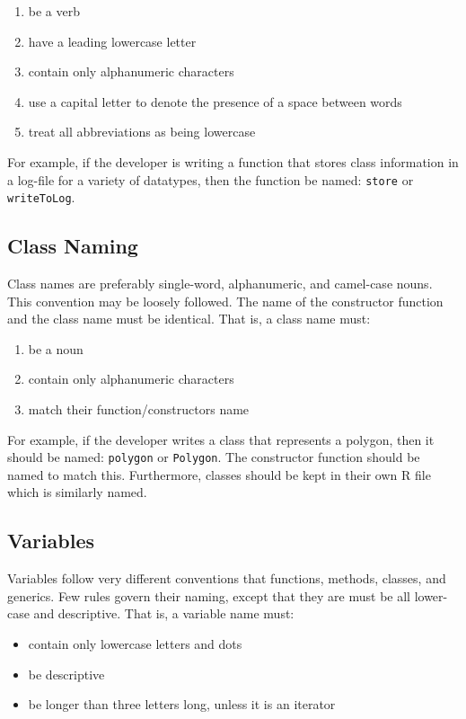 \documentclass[a4paper,10pt]{article}
\begin{document}
{\tt\begin{enumerate}
	\item{be a verb}
	\item{have a leading lowercase letter}
	\item{contain only alphanumeric characters}
	\item{use a capital letter to denote the presence of a space between words}
	\item{treat all abbreviations as being lowercase}
\end{enumerate}}


For example, if the developer is writing a function that stores class information in a log-file for a variety of datatypes, then the function be named: {\tt store} or {\tt writeToLog}.



\subsection{Class Naming}
Class names are preferably single-word, alphanumeric, and camel-case nouns.  This convention may be loosely followed.  The name of the constructor function and the class name must be identical.  That is, a class name must:
{\tt\begin{enumerate}
	\item{be a noun}
	\item{contain only alphanumeric characters}
	\item{match their function/constructors name}
\end{enumerate}}

For example, if the developer writes a class that represents a polygon, then it should be named: {\tt polygon} or {\tt Polygon}.  The constructor function should be named to match this.  Furthermore, classes should be kept in their own R file which is similarly named.



\subsection{Variables}
Variables follow very different conventions that functions, methods, classes, and generics.  Few rules govern their naming, except that they are must be all lower-case and descriptive.  That is, a variable name must:
{\tt\begin{itemize}
	\item{contain only lowercase letters and dots}
	\item{be descriptive}
	\item{be longer than three letters long, unless it is an iterator}
\end{itemize}}
\end{document}
